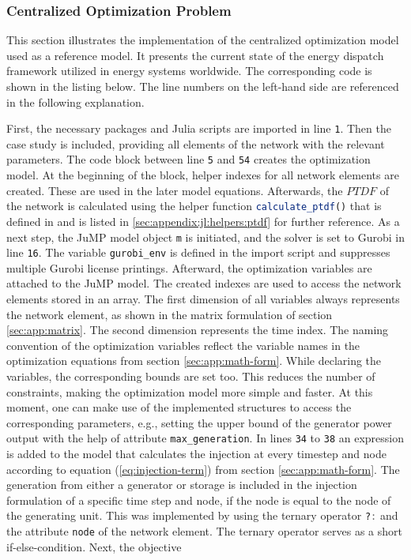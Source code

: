 \subsubsection{Centralized Optimization Problem}

This section illustrates the implementation of the centralized optimization model used as a reference model. It presents the current state of the energy dispatch framework utilized in energy systems worldwide. The corresponding code is shown in the listing below. The line numbers on the left-hand side are referenced in the following explanation.



First, the necessary packages and Julia scripts are imported in line \texttt{1}. Then the case study is included, providing all elements of the network with the relevant parameters. The code block between line \texttt{5} and \texttt{54} creates the optimization model. At the beginning of the block, helper indexes for all network elements are created. These are used in the later model equations. Afterwards, the $PTDF$ of the network is calculated using the helper function \lstinline[language=julia]{calculate_ptdf()} that is defined in  and is listed in \ref{sec:appendix:jl:helpers:ptdf} for further reference.  As a next step, the JuMP model object \lstinline[language=julia]{m} is initiated, and the solver is set to Gurobi in line \texttt{16}. The variable \lstinline[language=julia]{gurobi_env} is defined in the import script  and suppresses multiple Gurobi license printings. Afterward, the optimization variables are attached to the JuMP model. The created indexes are used to access the network elements stored in an array. The first dimension of all variables always represents the network element, as shown in the matrix formulation of section \ref{sec:app:matrix}. The second dimension represents the time index. The naming convention of the optimization variables reflect the variable names in the optimization equations from section \ref{sec:app:math-form}. While declaring the variables, the corresponding bounds are set too. This reduces the number of constraints, making the optimization model more simple and faster. At this moment, one can make use of the implemented structures to access the corresponding parameters, e.g., setting the upper bound of the generator power output with the help of attribute \lstinline[language=julia]{max_generation}. In lines \texttt{34} to \texttt{38} an expression is added to the model that calculates the injection at every timestep and node according to equation (\ref{eq:injection-term}) from section \ref{sec:app:math-form}. The generation from either a generator or storage is included in the injection formulation of a specific time step and node, if the node is equal to the node of the generating unit. This was implemented by using the ternary operator \lstinline[language=julia]{?:} and the attribute \lstinline[language=julia]{node} of the network element. The ternary operator serves as a short if-else-condition. Next, the objective 